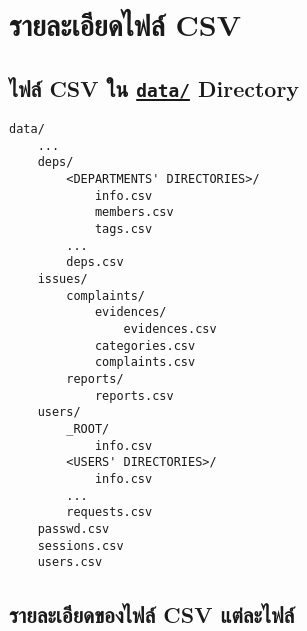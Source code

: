 \section{รายละเอียดไฟล์ CSV}

\subsection{ไฟล์ CSV ใน \href{https://github.com/CS211-651/project211-oakcoding/tree/9397d355461933fb007261e2ee97445ea93eacc1/data}{\texttt{data\slash}} Directory}

\begin{lstlisting}[name={ไฟล์ CSV ใน data/ Directory},numbers=none]
data/
    ...
    deps/
        <DEPARTMENTS' DIRECTORIES>/
            info.csv
            members.csv
            tags.csv
        ...
        deps.csv
    issues/
        complaints/
            evidences/
                evidences.csv
            categories.csv
            complaints.csv
        reports/
            reports.csv
    users/
        _ROOT/
            info.csv
        <USERS' DIRECTORIES>/
            info.csv
        ...
        requests.csv
    passwd.csv
    sessions.csv
    users.csv
\end{lstlisting}

\subsection{รายละเอียดของไฟล์ CSV แต่ละไฟล์}
\noindent\blindtext[3]
